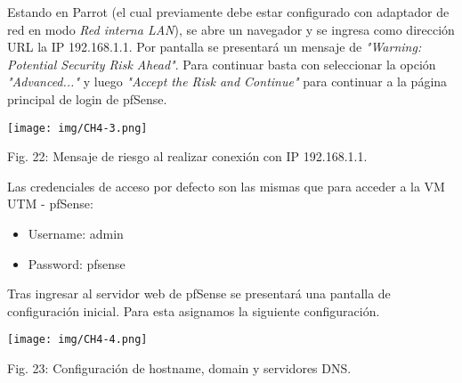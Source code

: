 \documentclass[12pt,oneside,a4paper]{book}
\begin{document}
\hspace{20pt}
Estando en Parrot (el cual previamente debe estar configurado con adaptador de red en modo \textit{Red interna LAN}), se abre un navegador y se ingresa como dirección URL la IP 192.168.1.1. Por pantalla se presentará un mensaje de \textit{"Warning: Potential Security Risk Ahead"}. Para continuar basta con seleccionar la opción \textit{"Advanced..."} y luego \textit{"Accept the Risk and Continue"} para continuar a la página principal de login de pfSense.

\vspace{2em}

\begin{center}
    \texttt{[image: img/CH4-3.png]}
    
\vspace{0.1em}
    
    Fig. 22: Mensaje de riesgo al realizar conexión con IP 192.168.1.1.
\end{center}

\vspace{2em}

\hspace{20pt}
Las credenciales de acceso por defecto son las mismas que para acceder a la VM UTM - pfSense:

\vspace{1em}

\begin{itemize}
    \item Username: admin
    \item Password: pfsense
\end{itemize}

\vspace{1em}

\hspace{20pt}
Tras ingresar al servidor web de pfSense se presentará una pantalla de configuración inicial. Para esta asignamos la  siguiente configuración.

\vspace{2em}

\begin{center}
    \texttt{[image: img/CH4-4.png]}
    
\vspace{0.1em}
    
    Fig. 23: Configuración de hostname, domain y servidores DNS.
\end{center}

\vspace{2em}
\end{document}
